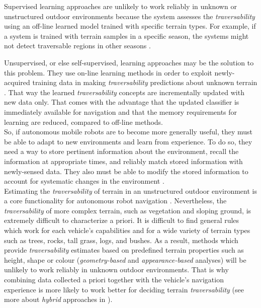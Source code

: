 \documentclass[12pt,a4paper]{report}
\newcommand{\term}{\textit}
\begin{document}
	Supervised learning approaches are unlikely to work reliably in unknown or 
	unstructured outdoor environments because the system assesses the 
	\term{traversability} using an off-line learned model trained with specific 
	terrain types. For example, if a system is trained with terrain samples in a 
	specific season, the systems might not detect traversable regions in other 
	seasons \cite{Lee}. 
	\par
	Unsupervised, or else self-supervised, learning approaches may be the solution 
	to this problem. They use on-line learning methods in order to exploit newly-
	acquired training data in making \term{traversability} predictions about unknown 
	terrain \cite{Kim}. That way the learned \term{traversability} concepts are 
	incrementally updated with new data only. That comes with the advantage that the 
	updated classifier is immediately available for navigation and that the memory 
	requirements for learning are reduced, compared to off-line methods.
	\\
	
	So, if autonomous mobile robots are to become more generally useful, they must 
	be able to adapt to new environments and learn from experience. To do so, they 
	need a way to store pertinent information about the environment, recall the 
	information at appropriate times, and reliably match stored information with 
	newly-sensed data. They also must be able to modify the stored information to 
	account for systematic changes in the environment \cite{Shneier}.
	\\
	
	Estimating the \term{traversability} of terrain in an unstructured outdoor 
	environment is a core functionality for autonomous robot navigation \cite{Kim}. 
	Nevertheless, the \term{traversability} of more complex terrain, such as 
	vegetation and sloping ground, is extremely difficult to characterize a priori. 
	It is difficult to find general rules which work for each vehicle's	capabilities
	and for a wide variety of terrain types such as trees, rocks, tall grass, logs, 
	and bushes. As a result, methods which provide \term{traversability} estimates 
	based on predefined terrain properties such as height, shape or colour 
	(\term{geometry-based} and \term{appearance-based} analyses) will be unlikely to 
	work reliably in unknown outdoor environments. That is why combining data 
	collected a priori together with the vehicle’s navigation experience is more 
	likely to work better for deciding terrain \term{traversability} (see more about 
	\term{hybrid} approaches in \cite{Papadakis}).
	\\
	
\end{document}
